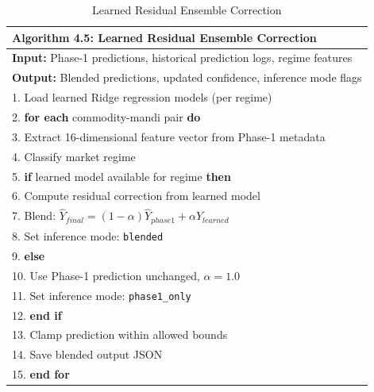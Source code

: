 \documentclass[12pt,a4paper]{report}
\theoremstyle{definition}
\theoremstyle{remark}
\begin{document}
\begin{table}[htbp]
\centering
\caption{Learned Residual Ensemble Correction}
\label{alg:learned}
\renewcommand{\arraystretch}{1.15}
\begin{tabular}{p{15cm}}
\toprule
\textbf{Algorithm 4.5: Learned Residual Ensemble Correction} \\
\midrule

\textbf{Input:} Phase-1 predictions, historical prediction logs, regime features \\

\textbf{Output:} Blended predictions, updated confidence, inference mode flags \\

\midrule

1. Load learned Ridge regression models (per regime) \\

2. \textbf{for each} commodity-mandi pair \textbf{do} \\

3. \quad Extract 16-dimensional feature vector from Phase-1 metadata \\

4. \quad Classify market regime \\

5. \quad \textbf{if} learned model available for regime \textbf{then} \\

6. \quad\quad Compute residual correction from learned model \\

7. \quad\quad Blend: $\hat{Y}_{final} = (1-\alpha)\hat{Y}_{phase1} + \alpha \hat{Y}_{learned}$ \\

8. \quad\quad Set inference mode: \texttt{blended} \\

9. \quad \textbf{else} \\

10. \quad\quad Use Phase-1 prediction unchanged, $\alpha = 1.0$ \\

11. \quad\quad Set inference mode: \texttt{phase1\_only} \\

12. \quad \textbf{end if} \\

13. \quad Clamp prediction within allowed bounds \\

14. \quad Save blended output JSON \\

15. \textbf{end for} \\

\bottomrule
\end{tabular}
\end{table}
\end{document}

